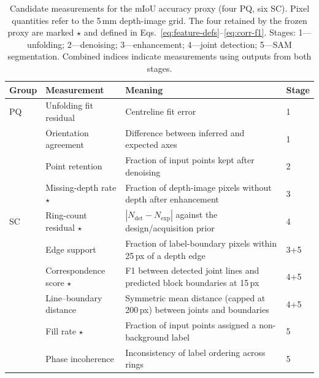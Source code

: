 \documentclass[a4paper,fleqn]{cas-dc}
\begin{document}
\begin{table}[t]
\caption{Candidate measurements for the mIoU accuracy proxy (four PQ, six SC). Pixel quantities refer to the 5\,mm depth-image grid. The four retained by the frozen proxy are marked $\star$ and defined in Eqs.~\eqref{eq:feature-defs}--\eqref{eq:corr-f1}. Stages: 1---unfolding; 2---denoising; 3---enhancement; 4---joint detection; 5---SAM segmentation. Combined indices indicate measurements using outputs from both stages.}
\label{tab:candidate-features}
\centering
\small
\setlength{\tabcolsep}{3pt}
\begin{tabular}{Y{0.05\textwidth} Y{0.27\textwidth} Y{0.45\textwidth} Y{0.16\textwidth}}
\toprule
Group & Measurement & Meaning & Stage \\
\midrule
PQ & Unfolding fit residual & Centreline fit error & 1 \\
 & Orientation agreement & Difference between inferred and expected axes & 1 \\
 & Point retention & Fraction of input points kept after denoising & 2 \\
 & Missing-depth rate $\star$ & Fraction of depth-image pixels without depth after enhancement & 3 \\
SC & Ring-count residual $\star$ & $|N_{\mathrm{det}}-N_{\mathrm{exp}}|$ against the design/acquisition prior & 4 \\
 & Edge support & Fraction of label-boundary pixels within 25\,px of a depth edge & 3+5 \\
 & Correspondence score $\star$ & F1 between detected joint lines and predicted block boundaries at 15\,px & 4+5 \\
 & Line--boundary distance & Symmetric mean distance (capped at 200\,px) between joints and boundaries & 4+5 \\
 & Fill rate $\star$ & Fraction of input points assigned a non-background label & 5 \\
 & Phase incoherence & Inconsistency of label ordering across rings & 5 \\
\bottomrule
\end{tabular}
\end{table}
\end{document}
